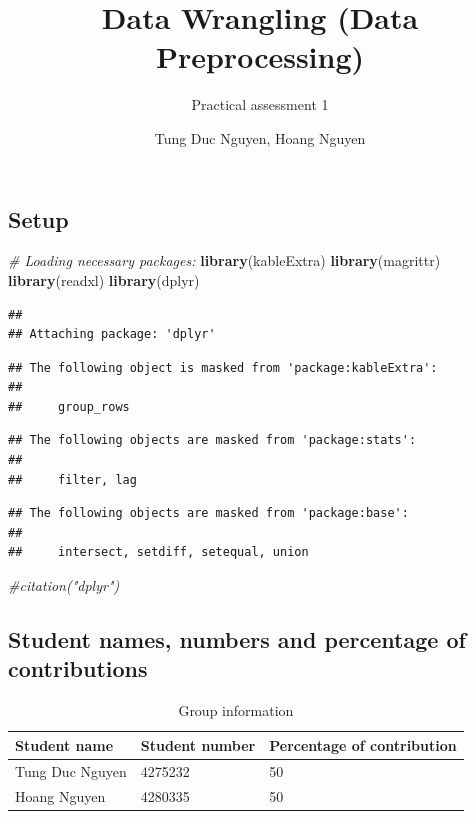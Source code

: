 \documentclass[
]{article}
\title{Data Wrangling (Data Preprocessing)}
\subtitle{Practical assessment 1}
\author{Tung Duc Nguyen, Hoang Nguyen}
\date{}
\newenvironment{Shaded}{\begin{snugshade}}{\end{snugshade}}
\newcommand{\CommentTok}[1]{\textcolor[rgb]{0.56,0.35,0.01}{\textit{#1}}}
\newcommand{\FunctionTok}[1]{\textcolor[rgb]{0.13,0.29,0.53}{\textbf{#1}}}
\newcommand{\NormalTok}[1]{#1}
\begin{document}
\maketitle

\subsection{\texorpdfstring{\textbf{Setup}}{Setup}}\label{setup}

\begin{Shaded}
\begin{Highlighting}[]
\CommentTok{\# Loading necessary packages:}
\FunctionTok{library}\NormalTok{(kableExtra)}
\FunctionTok{library}\NormalTok{(magrittr)}
\FunctionTok{library}\NormalTok{(readxl)}
\FunctionTok{library}\NormalTok{(dplyr)}
\end{Highlighting}
\end{Shaded}

\begin{verbatim}
## 
## Attaching package: 'dplyr'
\end{verbatim}

\begin{verbatim}
## The following object is masked from 'package:kableExtra':
## 
##     group_rows
\end{verbatim}

\begin{verbatim}
## The following objects are masked from 'package:stats':
## 
##     filter, lag
\end{verbatim}

\begin{verbatim}
## The following objects are masked from 'package:base':
## 
##     intersect, setdiff, setequal, union
\end{verbatim}

\begin{Shaded}
\begin{Highlighting}[]
\CommentTok{\#citation("dplyr")}
\end{Highlighting}
\end{Shaded}

\subsection{\texorpdfstring{\textbf{Student names, numbers and
percentage of
contributions}}{Student names, numbers and percentage of contributions}}\label{student-names-numbers-and-percentage-of-contributions}

\begin{table}
\centering
\caption{\label{tab:unnamed-chunk-2}Group information}
\centering
\begin{tabular}[t]{l|l|l}
\hline
Student name & Student number & Percentage of contribution\\
\hline
Tung Duc Nguyen & 4275232 & 50\\
\hline
Hoang Nguyen & 4280335 & 50\\
\hline
\end{tabular}
\end{table}
\end{document}
